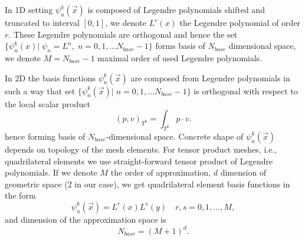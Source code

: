 In 1D setting $\psi_n^k(\vec{x})$ is composed of Legendre polynomials shifted 
and truncated to interval $[0, 1]$, we denote $L^r(x)$ the Legendre 
polynomial of order $r$. These Legendre polynomials are orthogonal and hence 
the set  $\{\psi_n^k(x)| \; \psi_n = L^n, \; n = 0,1, \dots  N_{base} - 
1\}$ forms basis of  $N_{base}$ dimensional space, we denote $M = N_{base} - 
1$ maximal order of used Legendre polynomials.

In 2D the basis functions $\psi_n^k(\vec{x})$ are composed from Legendre 
polynomials  in such a way that set $\{\psi_n^k(\vec{x})| \; n = 0,1, \dots  
N_{base} - 1\}$ is orthogonal with respect to the local 
scalar product
\begin{equation}
\label{eq:scalar_prod_dk}
(p, v)_{T^k} = \int_{T^k} p \cdot v.
\end{equation}
hence forming basis of $N_{base}$-dimensional space. Concrete shape of 
$\psi_n^k(\vec{x})$ depends on topology of the mesh elements. For 
tensor product meshes, i.e., quadrilateral elements we use straight-forward 
tensor product of Legendre polynomials. If we denote $M$ the order of 
approximation, $d$ dimension of geometric space (2 in our case), we get 
quadrilateral element basis functions in the form
\begin{equation}
\psi_n^k(\vec{x}) = L^r(x)L^s(y)\quad r, s = 0,1, \dots, M,
\end{equation}
and dimension of the approximation space is
\begin{equation}
N_{base} = (M + 1)^d.
\end{equation}

